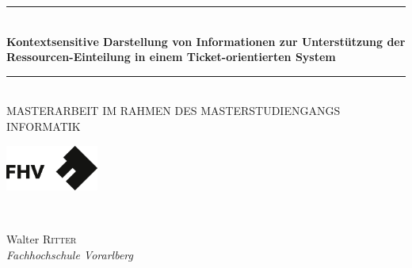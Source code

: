 
\begin{titlepage}




\begin{center}


\newcommand{\HRule}{\rule{\linewidth}{0.5mm}}
\HRule \\[0.4cm]
{ \huge \bfseries Kontextsensitive Darstellung von Informationen zur Unterstützung der Ressourcen-Einteilung in einem Ticket-orientierten System}\\ [0.4cm]%
\HRule \\[1cm]

\textsc{\large MASTERARBEIT IM RAHMEN DES
MASTERSTUDIENGANGS INFORMATIK}\\[3cm]



\begin{minipage}{0.48\textwidth}
\begin{center} 
\includegraphics[height=1.5cm]{./img/FHVlogo1}
\end{center}
\end{minipage}
\hfill\\ [0.2cm]



\begin{minipage}{0.48\textwidth}
\begin{center} \large

Walter \textsc{Ritter} \\ %
\emph{Fachhochschule Vorarlberg}


\end{center}
\end{minipage}
\end{center}
\end{titlepage}
